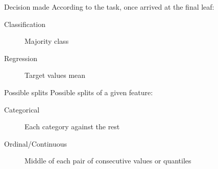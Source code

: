 \begin{frame}{Decision made}
  According to the task, once arrived at the final leaf:

  \begin{description}
  \item[Classification] Majority class
  \item[Regression] Target values mean
  \end{description}
\end{frame}

\begin{frame}{Possible splits}
  Possible splits of a given feature:
  \begin{description}
    \item[Categorical] Each category against the rest
    \item[Ordinal/Continuous] Middle of each pair of consecutive values or quantiles
  \end{description}
\end{frame}